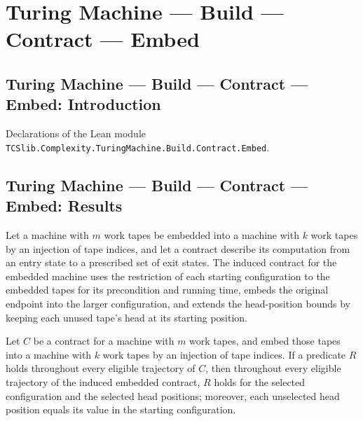 \section{Turing Machine --- Build --- Contract --- Embed}
\subsection*{Turing Machine --- Build --- Contract --- Embed: Introduction}

Declarations of the Lean module \texttt{TCSlib.Complexity.TuringMachine.Build.Contract.Embed}.

\subsection*{Turing Machine --- Build --- Contract --- Embed: Results}

\begin{definition}
\label{Turing.Contract.embed}
\leanok
{}
Let a machine with $m$ work tapes be embedded into a machine with $k$ work tapes by an
injection of tape indices, and let a contract describe its computation from an entry
state to a prescribed set of exit states. The induced contract for the embedded machine
uses the restriction of each starting configuration to the embedded tapes for its
precondition and running time, embeds the original endpoint into the larger
configuration, and extends the head-position bounds by keeping each unused tape's head
at its starting position.
\end{definition}

\begin{theorem}
\label{Turing.Contract.Traj.embed}
\leanok
{}
Let $C$ be a contract for a machine with $m$ work tapes, and embed those tapes into a
machine with $k$ work tapes by an injection of tape indices. If a predicate $R$ holds
throughout every eligible trajectory of $C$, then throughout every eligible trajectory
of the induced embedded contract, $R$ holds for the selected configuration and the
selected head positions; moreover, each unselected head position equals its value in the
starting configuration.
\end{theorem}

